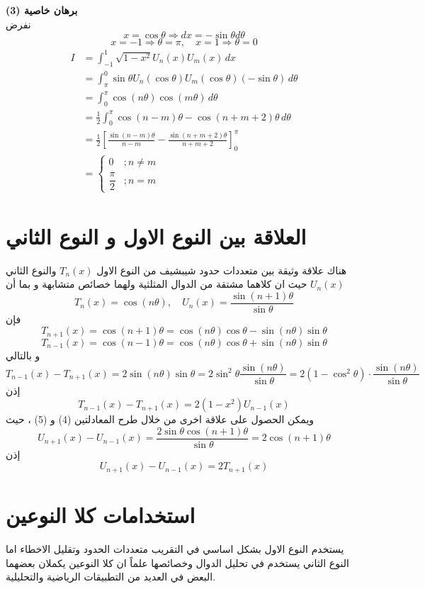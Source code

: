 \noindent
\textbf{برهان خاصية (3)}\\
\noindent
نفرض 
\[
x = \cos \theta \Rightarrow dx = -\sin \theta d\theta
\]
\[
x=-1 \Rightarrow \theta = \pi , \quad x=1 \Rightarrow \theta = 0
\]
\begin{align*}
	I &= \int_{-1}^{1} \sqrt{1-x^2} U_n(x) U_m(x) \, dx \\
	   &= \int_{\pi}^{0} \sin \theta U_n(\cos \theta) U_m(\cos \theta)  (-\sin\theta) \, d\theta\\
	   &= \int_{0}^{\pi} \cos(n\theta) \cos(m\theta) \, d\theta\\
	   &= \frac{1}{2}\int_{0}^{\pi} \cos(n-m)\theta - \cos(n+m+2)\theta \,d \theta\\
	   &= \frac{1}{2} \left[\frac{\sin(n-m)\theta}{n-m} - \frac{\sin(n+m+2)\theta}{n+m+2}\right]_0^{\pi}\\
	   &= \begin{cases}
	   	0 & ;n \neq m \\
	   	\dfrac{\pi}{2} & ; n = m
	   \end{cases}
\end{align*}


\section{العلاقة بين النوع الاول و النوع الثاني}
هناك علاقة وثيقة بين متعددات حدود شيبشيف من النوع الاول  $T_n(x)$ والنوع الثاني $U_n(x)$ حيث ان كلاهما مشتقة من الدوال المثلثية ولهما خصائص متشابهة و بما أن   
\[
T_n(x) = \cos(n \theta), \quad U_n(x) = \frac{\sin(n+1)\theta}{\sin\theta}
\]
فإن
\[
T_{n+1}(x) = \cos(n+1)\theta = \cos(n\theta)\cos\theta - \sin(n\theta)\sin\theta 
\]
\[
T_{n-1}(x) = \cos(n-1)\theta = \cos(n\theta)\cos\theta + \sin(n\theta)\sin\theta 
\]
و بالتالي
\[
T_{n-1}(x) - T_{n+1}(x) = 2 \sin(n\theta) \sin\theta = 2 \sin^2\theta \frac{\sin(n\theta)}{\sin\theta} = 2(1-\cos^2 \theta)\cdot\frac{\sin(n\theta)}{\sin \theta}
\]
إذن 
\begin{equation}
	T_{n-1}(x) - T_{n+1}(x) = 2 (1-x^2) U_{n-1}(x) 
\end{equation}
ويمكن الحصول على علاقة اخرى من خلال طرح المعادلتين (4) و (5) ، حيث
\[
U_{n+1}(x) - U_{n-1}(x) = \frac{2\sin\theta\cos(n+1)\theta}{\sin\theta} = 2 \cos(n+1)\theta
\]
إذن 
\begin{equation}
	U_{n+1}(x) - U_{n-1}(x)  = 2T_{n+1}(x)
\end{equation}


\section{استخدامات كلا النوعين}
يستخدم النوع الاول بشكل اساسي في التقريب متعددات الحدود وتقليل الاخطاء اما النوع الثاني يستخدم في تحليل الدوال وخصائصها علماً ان كلا النوعين يكملان بعضهما البعض في العديد من التطبيقات الرياضية والتحليلية. 

